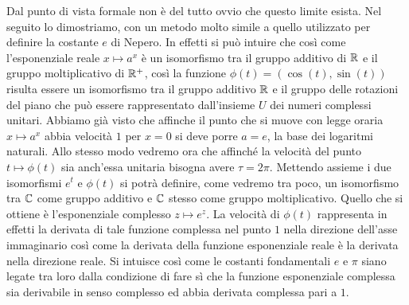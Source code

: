 Dal punto di vista formale non è del tutto ovvio che questo limite esista.
Nel seguito lo dimostriamo, con un metodo molto simile a quello utilizzato 
per definire la costante $e$ di Nepero.
In effetti si può intuire che così come l'esponenziale reale $x\mapsto a^x$ 
è un isomorfismo tra il gruppo additivo di ${\mathbb R}$ e il gruppo moltiplicativo 
di ${\mathbb R}^+$, così la funzione $\phi(t) = (\cos(t), \sin(t))$ 
risulta essere un isomorfismo 
tra il gruppo additivo ${\mathbb R}$ e il gruppo delle rotazioni del piano che può essere 
rappresentato dall'insieme $U$ dei numeri complessi unitari.
Abbiamo già visto che affinche il punto che si muove con legge 
oraria $x\mapsto a^x$ abbia velocità $1$ per $x=0$ 
si deve porre $a=e$, la base dei logaritmi naturali.
Allo stesso modo vedremo ora che affinché la velocità 
del punto $t\mapsto \phi(t)$ 
sia anch'essa unitaria bisogna avere $\tau = 2\pi$.
Mettendo assieme i due isomorfismi $e^t$ e $\phi(t)$ si potrà definire,
come vedremo tra poco, un isomorfismo tra ${\mathbb C}$ come gruppo additivo e 
${\mathbb C}$ stesso come gruppo moltiplicativo.
Quello che si ottiene è l'esponenziale complesso $z\mapsto e^z$. 
La velocità di $\phi(t)$ rappresenta in effetti la derivata di tale funzione 
complessa nel punto $1$ nella direzione dell'asse immaginario 
così come la derivata della funzione esponenziale reale è la derivata 
nella direzione reale. 
Si intuisce così come le costanti fondamentali $e$ e $\pi$ siano legate 
tra loro dalla condizione di fare sì che la funzione esponenziale complessa 
sia derivabile in senso complesso ed abbia derivata complessa pari a $1$.

